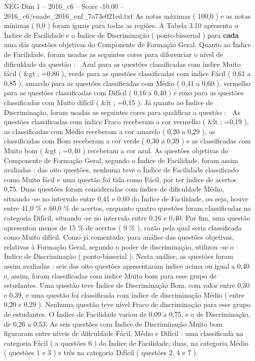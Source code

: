 \begin{textsample}{NEG Dim 1 – 2016\_c6 – Score -10.00 – 2016\_c6/enade\_2016\_enf\_7a73e021ed.txt}
As notas máximas ( 100,0 ) e as notas mínimas ( 0,0 ) foram iguais para todas as regiões.
A Tabela 3.10 apresenta o Índice de Facilidade e o Índice de Discriminação ( ponto-bisserial ) para \textbf{cada} uma das questões objetivas do Componente de Formação Geral.
Quanto ao Índice de Facilidade, foram usadas as seguintes cores para diferenciar o nível de dificuldade da questão :  Azul para as questões classificadas com índice Muito fácil ( \&gt ; =0,86 ), verde para as questões classificadas com índice Fácil ( 0,61 a 0,85 ), amarelo para as questões classificadas com Médio ( 0,41 a 0,60 ), vermelho para as questões classificadas com Difícil ( 0,16 a 0,40 ) e roxo para as questões classificadas com Muito difícil ( \&lt ; =0,15 ).
Já quanto ao Índice de Discriminação, foram usadas as seguintes cores para qualificar a questão :  As questões classificadas com índice Fraco receberam a cor vermelho ( \&lt ; =0,19 ), as classificadas com Médio receberam a cor amarelo ( 0,20 a 0,29 ), as classificadas com Bom receberam a cor verde ( 0,30 a 0,39 ) e as classificadas com Muito bom ( \&gt ; =0,40 ) receberam a cor azul.
As questões objetivas do Componente de Formação Geral, segundo o Índice de Facilidade, foram assim avaliadas : das oito questões, nenhuma teve o Índice de Facilidade classificado como Muito fácil e uma questão foi tida como Fácil, por ter índice de acertos 0,75.
Duas questões foram consideradas com índice de dificuldade Médio, situando -se no intervalo entre 0,41 e 0,60 do Índice de Facilidade, ou seja, houve entre 41,0 \% e 60,0 \% de acertos, enquanto quatro questões foram classificadas na categoria Difícil, situando -se no intervalo entre 0,16 e 0,40.
Por fim, uma questão apresentou menos de 15 \% de acertos ( 9 \% ), razão pela qual seria classificada como Muito difícil.
Como já comentado, para análise das questões objetivas, relativas à Formação Geral, segundo o poder de discriminação, utilizou -se o Índice de Discriminação ( ponto-bisserial ).
Nesta análise, as questões foram assim avaliadas : seis das oito questões apresentaram índice acima ou igual a 0,40 e, assim, foram classificadas com índice Muito bom para esse grupo de estudantes.
Uma questão teve Índice de Discriminação Bom, com valor entre 0,30 e 0,39, e uma questão foi classificada com índice de discriminação Médio ( entre 0,20 e 0,29 ).
Nenhuma questão teve nível Fraco de discriminação para esse grupo de estudantes.
O Índice de Facilidade variou de 0,09 a 0,75, e o de Discriminação, de 0,26 a 0,53.
As seis questões com Índice de Discriminação Muito bom figuraram entre níveis de dificuldade Fácil, Médio e Difícil : uma classificada na categoria Fácil ( a questões 6 ) do Índice de Facilidade, duas, na categoria Médio ( questões 1 e 3 ) e três na categoria Difícil ( questões 2, 4 e 7 ).

\end{textsample}
